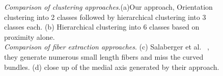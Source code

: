 

\begin{figure}[h]
\centering
{}


   \caption{\textit{Comparison of clustering approaches}.(a)Our approach,  Orientation clustering into 2 classes followed by hierarchical clustering into 3 classes each. (b) Hierarchical clustering into 6 classes based on proximity alone.\\
   \textit{Comparison of fiber extraction approaches}. (c) Salaberger et al. ~\cite{Salaberger2011}, they generate numerous small length fibers and miss the curved bundles. (d) close up of the medial axis generated by their approach.}\label{fig:compare-2}
\end{figure}


